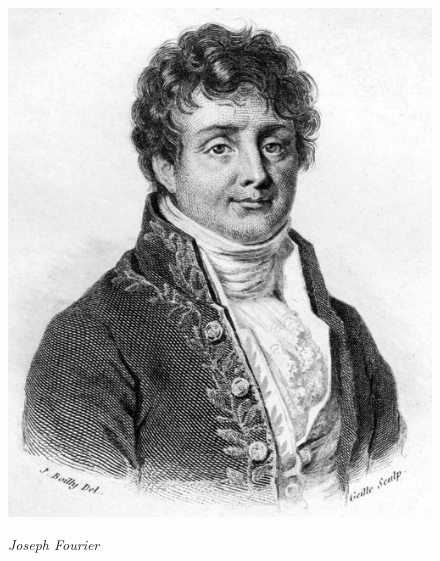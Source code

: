 \documentclass[a4paper,12pt]{report}
\begin{document}
\begin{figure}
\centering
\includegraphics[scale=0.25]{fourier.jpg}\\
\caption{\textit{Joseph Fourier}}
\end{figure}
\newpage


	
\end{document}
